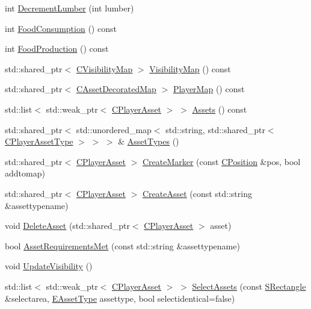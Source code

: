 \begin{DoxyCompactItemize}
int \hyperlink{classCPlayerData_a0c79b0b958333fc52b1de5ec93c01ede}{Decrement\+Lumber} (int lumber)
\item 
int \hyperlink{classCPlayerData_a45b5ba15a17796acdbaca7eacc7532d0}{Food\+Consumption} () const
\item 
int \hyperlink{classCPlayerData_ae71ad19439d31ba0eb7f59809885ed6d}{Food\+Production} () const
\item 
std\+::shared\+\_\+ptr$<$ \hyperlink{classCVisibilityMap}{C\+Visibility\+Map} $>$ \hyperlink{classCPlayerData_af263bd5a4864d98570d5a8a3f7986cdd}{Visibility\+Map} () const
\item 
std\+::shared\+\_\+ptr$<$ \hyperlink{classCAssetDecoratedMap}{C\+Asset\+Decorated\+Map} $>$ \hyperlink{classCPlayerData_a9a54d695ff57c633dfb3a18c98408c54}{Player\+Map} () const
\item 
std\+::list$<$ std\+::weak\+\_\+ptr$<$ \hyperlink{classCPlayerAsset}{C\+Player\+Asset} $>$ $>$ \hyperlink{classCPlayerData_a9715c8a64e26d669556b029901ec5ab5}{Assets} () const
\item 
std\+::shared\+\_\+ptr$<$ std\+::unordered\+\_\+map$<$ std\+::string, std\+::shared\+\_\+ptr$<$ \hyperlink{classCPlayerAssetType}{C\+Player\+Asset\+Type} $>$ $>$ $>$ \& \hyperlink{classCPlayerData_adbe01c300ec2d40267ca84c7529b9045}{Asset\+Types} ()
\item 
std\+::shared\+\_\+ptr$<$ \hyperlink{classCPlayerAsset}{C\+Player\+Asset} $>$ \hyperlink{classCPlayerData_a4ef7c98c3b0f28354a2bccc2782b57ad}{Create\+Marker} (const \hyperlink{classCPosition}{C\+Position} \&pos, bool addtomap)
\item 
std\+::shared\+\_\+ptr$<$ \hyperlink{classCPlayerAsset}{C\+Player\+Asset} $>$ \hyperlink{classCPlayerData_a4d203da2adbd6d00b0cd5b334bddba4f}{Create\+Asset} (const std\+::string \&assettypename)
\item 
void \hyperlink{classCPlayerData_a24f56e033f6d68ceba0f876d854201f0}{Delete\+Asset} (std\+::shared\+\_\+ptr$<$ \hyperlink{classCPlayerAsset}{C\+Player\+Asset} $>$ asset)
\item 
bool \hyperlink{classCPlayerData_a21238056db09447e0ed054aafbd953c1}{Asset\+Requirements\+Met} (const std\+::string \&assettypename)
\item 
void \hyperlink{classCPlayerData_a3ac1393306e8a3f7c95d13ca01e429a7}{Update\+Visibility} ()
\item 
std\+::list$<$ std\+::weak\+\_\+ptr$<$ \hyperlink{classCPlayerAsset}{C\+Player\+Asset} $>$ $>$ \hyperlink{classCPlayerData_afb3303a53687383e4101d4de37391d84}{Select\+Assets} (const \hyperlink{structSRectangle}{S\+Rectangle} \&selectarea, \hyperlink{GameDataTypes_8h_a5600d4fc433b83300308921974477fec}{E\+Asset\+Type} assettype, bool selectidentical=false)

\end{DoxyCompactItemize}
